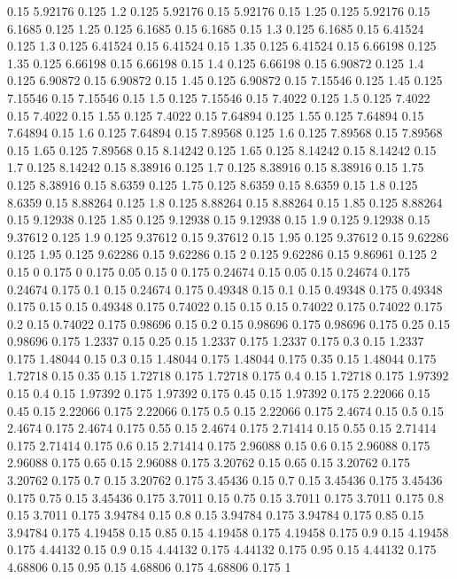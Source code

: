 0.15 5.92176
0.125 1.2
0.125 5.92176
0.15 5.92176
0.15 1.25
0.125 5.92176
0.15 6.1685
0.125 1.25
0.125 6.1685
0.15 6.1685
0.15 1.3
0.125 6.1685
0.15 6.41524
0.125 1.3
0.125 6.41524
0.15 6.41524
0.15 1.35
0.125 6.41524
0.15 6.66198
0.125 1.35
0.125 6.66198
0.15 6.66198
0.15 1.4
0.125 6.66198
0.15 6.90872
0.125 1.4
0.125 6.90872
0.15 6.90872
0.15 1.45
0.125 6.90872
0.15 7.15546
0.125 1.45
0.125 7.15546
0.15 7.15546
0.15 1.5
0.125 7.15546
0.15 7.4022
0.125 1.5
0.125 7.4022
0.15 7.4022
0.15 1.55
0.125 7.4022
0.15 7.64894
0.125 1.55
0.125 7.64894
0.15 7.64894
0.15 1.6
0.125 7.64894
0.15 7.89568
0.125 1.6
0.125 7.89568
0.15 7.89568
0.15 1.65
0.125 7.89568
0.15 8.14242
0.125 1.65
0.125 8.14242
0.15 8.14242
0.15 1.7
0.125 8.14242
0.15 8.38916
0.125 1.7
0.125 8.38916
0.15 8.38916
0.15 1.75
0.125 8.38916
0.15 8.6359
0.125 1.75
0.125 8.6359
0.15 8.6359
0.15 1.8
0.125 8.6359
0.15 8.88264
0.125 1.8
0.125 8.88264
0.15 8.88264
0.15 1.85
0.125 8.88264
0.15 9.12938
0.125 1.85
0.125 9.12938
0.15 9.12938
0.15 1.9
0.125 9.12938
0.15 9.37612
0.125 1.9
0.125 9.37612
0.15 9.37612
0.15 1.95
0.125 9.37612
0.15 9.62286
0.125 1.95
0.125 9.62286
0.15 9.62286
0.15 2
0.125 9.62286
0.15 9.86961
0.125 2
0.15 0
0.175 0
0.175 0.05
0.15 0
0.175 0.24674
0.15 0.05
0.15 0.24674
0.175 0.24674
0.175 0.1
0.15 0.24674
0.175 0.49348
0.15 0.1
0.15 0.49348
0.175 0.49348
0.175 0.15
0.15 0.49348
0.175 0.74022
0.15 0.15
0.15 0.74022
0.175 0.74022
0.175 0.2
0.15 0.74022
0.175 0.98696
0.15 0.2
0.15 0.98696
0.175 0.98696
0.175 0.25
0.15 0.98696
0.175 1.2337
0.15 0.25
0.15 1.2337
0.175 1.2337
0.175 0.3
0.15 1.2337
0.175 1.48044
0.15 0.3
0.15 1.48044
0.175 1.48044
0.175 0.35
0.15 1.48044
0.175 1.72718
0.15 0.35
0.15 1.72718
0.175 1.72718
0.175 0.4
0.15 1.72718
0.175 1.97392
0.15 0.4
0.15 1.97392
0.175 1.97392
0.175 0.45
0.15 1.97392
0.175 2.22066
0.15 0.45
0.15 2.22066
0.175 2.22066
0.175 0.5
0.15 2.22066
0.175 2.4674
0.15 0.5
0.15 2.4674
0.175 2.4674
0.175 0.55
0.15 2.4674
0.175 2.71414
0.15 0.55
0.15 2.71414
0.175 2.71414
0.175 0.6
0.15 2.71414
0.175 2.96088
0.15 0.6
0.15 2.96088
0.175 2.96088
0.175 0.65
0.15 2.96088
0.175 3.20762
0.15 0.65
0.15 3.20762
0.175 3.20762
0.175 0.7
0.15 3.20762
0.175 3.45436
0.15 0.7
0.15 3.45436
0.175 3.45436
0.175 0.75
0.15 3.45436
0.175 3.7011
0.15 0.75
0.15 3.7011
0.175 3.7011
0.175 0.8
0.15 3.7011
0.175 3.94784
0.15 0.8
0.15 3.94784
0.175 3.94784
0.175 0.85
0.15 3.94784
0.175 4.19458
0.15 0.85
0.15 4.19458
0.175 4.19458
0.175 0.9
0.15 4.19458
0.175 4.44132
0.15 0.9
0.15 4.44132
0.175 4.44132
0.175 0.95
0.15 4.44132
0.175 4.68806
0.15 0.95
0.15 4.68806
0.175 4.68806
0.175 1
